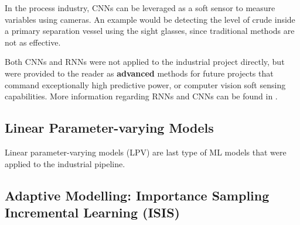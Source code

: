In the process industry, CNNs can be leveraged as a soft sensor to measure variables using cameras. An example would be detecting the level of crude inside a primary separation vessel using the sight glasses, since traditional methods are not as effective.

Both CNNs and RNNs were not applied to the industrial project directly, but were provided to the reader as \textbf{advanced} methods for future projects that command exceptionally high predictive power, or computer vision soft sensing capabilities.  More information regarding RNNs and CNNs can be found in \cite{NN}.

\subsection{Linear Parameter-varying Models}
Linear parameter-varying models (LPV) are last type of ML models that were applied to the industrial pipeline.  

\subsection{Adaptive Modelling: Importance Sampling Incremental Learning (ISIS)}

